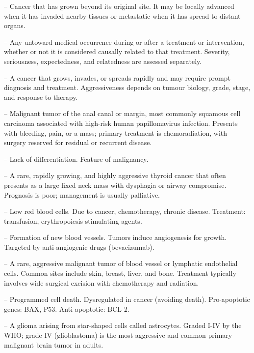-- Cancer that has grown beyond its original site. It may be locally advanced when it has invaded nearby tissues or metastatic when it has spread to distant organs.

-- Any untoward medical occurrence during or after a treatment or intervention, whether or not it is considered causally related to that treatment. Severity, seriousness, expectedness, and relatedness are assessed separately.

-- A cancer that grows, invades, or spreads rapidly and may require prompt diagnosis and treatment. Aggressiveness depends on tumour biology, grade, stage, and response to therapy.

-- Malignant tumor of the anal canal or margin, most commonly squamous cell carcinoma associated with high-risk human papillomavirus infection. Presents with bleeding, pain, or a mass; primary treatment is chemoradiation, with surgery reserved for residual or recurrent disease.

-- Lack of differentiation. Feature of malignancy.

-- A rare, rapidly growing, and highly aggressive thyroid cancer that often presents as a large fixed neck mass with dysphagia or airway compromise. Prognosis is poor; management is usually palliative.

-- Low red blood cells. Due to cancer, chemotherapy, chronic disease. Treatment: transfusion, erythropoiesis-stimulating agents.

-- Formation of new blood vessels. Tumors induce angiogenesis for growth. Targeted by anti-angiogenic drugs (bevacizumab).

-- A rare, aggressive malignant tumor of blood vessel or lymphatic endothelial cells. Common sites include skin, breast, liver, and bone. Treatment typically involves wide surgical excision with chemotherapy and radiation.

-- Programmed cell death. Dysregulated in cancer (avoiding death). Pro-apoptotic genes: BAX, P53. Anti-apoptotic: BCL-2.

-- A glioma arising from star-shaped cells called astrocytes. Graded I-IV by the WHO; grade IV (glioblastoma) is the most aggressive and common primary malignant brain tumor in adults.

